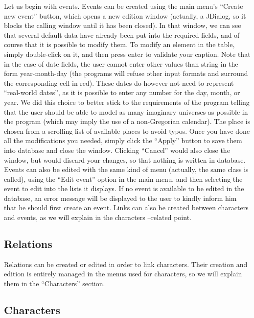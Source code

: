\documentclass[a4paper ,12pt,french]{article}
\begin{document}
Let us begin with events. 
Events can be created using the main menu’s “Create new event” button, which opens a new edition window (actually, a JDialog, so it blocks the calling window until it has been closed). In that window, we can see that several default data have already been put into the required fields, and of course that it is possible to modify them. To modify an element in the table, simply double-click on it, and then press enter to validate your caption. Note that in the case of date fields, the user cannot enter other values than string in the form year-month-day (the programs will refuse other input formats and surround the corresponding cell in red). These dates do however not need to represent “real-world dates”, as it is possible to enter any number for the day, month, or year. We did this choice to better stick to the requirements of the program telling that the user should be able to model as many imaginary universes as possible in the program (which may imply the use of a non-Gregorian calendar). The place is chosen from a scrolling list of available places to avoid typos. Once you have done all the modifications you needed, simply click the “Apply” button to save them into database and close the window. Clicking “Cancel” would also close the window, but would discard your changes, so that nothing is written in database.
Events can also be edited with the same kind of menu (actually, the same class is called), using the “Edit event” option in the main menu, and then selecting the event to edit into the lists it displays. If no event is available to be edited in the database, an error message will be displayed to the user to kindly inform him that he should first create an event.
Links can also be created between characters and events, as we will explain in the characters –related point.

\subsection{Relations}

Relations can be created or edited in order to link characters. Their creation and edition is entirely managed in the menus used for characters, so we will explain them in the “Characters” section.

\subsection{Characters}
\end{document}
